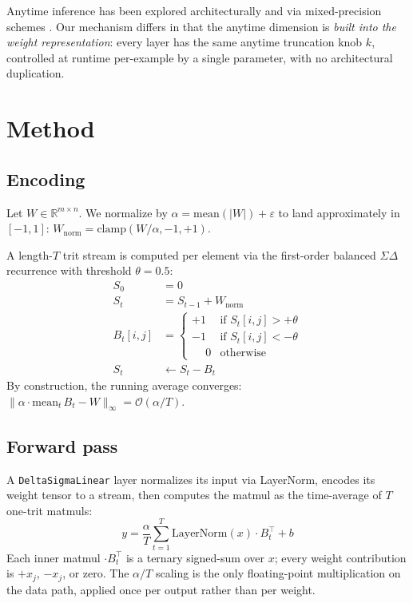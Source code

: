 \documentclass[11pt]{article}
\begin{document}
Anytime inference has been explored architecturally
\citep{teerapittayanon2016branchynet, huang2018msdnet,
cai2020onceforall} and via mixed-precision schemes
\citep{wang2019haq}. Our mechanism differs in that the anytime
dimension is \emph{built into the weight representation}: every layer
has the same anytime truncation knob $k$, controlled at runtime
per-example by a single parameter, with no architectural duplication.

\section{Method}

\subsection{Encoding}

Let $W \in \mathbb{R}^{m\times n}$. We normalize by
$\alpha = \text{mean}(|W|) + \varepsilon$ to land approximately in
$[-1, 1]$:
$W_{\text{norm}} = \text{clamp}(W/\alpha, -1, +1)$.

A length-$T$ trit stream is computed per element via the first-order
balanced $\Sigma\Delta$ recurrence with threshold $\theta = 0.5$:
\begin{align*}
S_0 &= 0 \\
S_t &= S_{t-1} + W_{\text{norm}} \\
B_t[i,j] &= \begin{cases}
  +1 & \text{if } S_t[i,j] > +\theta \\
  -1 & \text{if } S_t[i,j] < -\theta \\
  \phantom{+}0 & \text{otherwise}
\end{cases} \\
S_t &\leftarrow S_t - B_t
\end{align*}
By construction, the running average converges:
$\| \alpha \cdot \text{mean}_t\, B_t - W \|_\infty = \mathcal{O}(\alpha/T)$.

\subsection{Forward pass}

A \texttt{DeltaSigmaLinear} layer normalizes its input via LayerNorm,
encodes its weight tensor to a stream, then computes the matmul as the
time-average of $T$ one-trit matmuls:
\begin{equation*}
y = \frac{\alpha}{T} \sum_{t=1}^{T} \text{LayerNorm}(x) \cdot B_t^\top + b
\end{equation*}
Each inner matmul $\cdot B_t^\top$ is a ternary signed-sum over $x$;
every weight contribution is $+x_j$, $-x_j$, or zero. The
$\alpha/T$ scaling is the only floating-point multiplication on the
data path, applied once per output rather than per weight.
\end{document}
